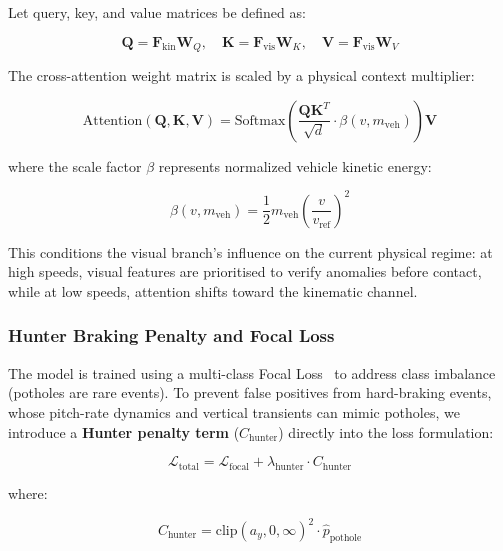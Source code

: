 \documentclass[conference]{IEEEtran}
\begin{document}
Let query, key, and value matrices be defined as:

\begin{equation}
\label{eq:qkv}
\mathbf{Q} = \mathbf{F}_{\text{kin}} \mathbf{W}_Q, \quad \mathbf{K} = \mathbf{F}_{\text{vis}} \mathbf{W}_K, \quad \mathbf{V} = \mathbf{F}_{\text{vis}} \mathbf{W}_V
\end{equation}

The cross-attention weight matrix is scaled by a physical context multiplier:

\begin{equation}
\label{eq:pica_attn}
\text{Attention}(\mathbf{Q}, \mathbf{K}, \mathbf{V}) = \text{Softmax}\left( \frac{\mathbf{Q} \mathbf{K}^T}{\sqrt{d}} \cdot \beta(v, m_{\text{veh}}) \right) \mathbf{V}
\end{equation}

where the scale factor $\beta$ represents normalized vehicle kinetic energy:

\begin{equation}
\label{eq:beta_pica}
\beta(v, m_{\text{veh}}) = \frac{1}{2} m_{\text{veh}} \left( \frac{v}{v_{\text{ref}}} \right)^2
\end{equation}

This conditions the visual branch's influence on the current physical regime: at high speeds, visual features are prioritised to verify anomalies before contact, while at low speeds, attention shifts toward the kinematic channel.

\subsubsection{Hunter Braking Penalty and Focal Loss}
The model is trained using a multi-class Focal Loss~\cite{lin2017focal} to address class imbalance (potholes are rare events).
To prevent false positives from hard-braking events, whose pitch-rate dynamics and vertical transients can mimic potholes, we introduce a \textbf{Hunter penalty term} ($C_{\text{hunter}}$) directly into the loss formulation:

\begin{equation}
\label{eq:hunter_penalty}
\mathcal{L}_{\text{total}} = \mathcal{L}_{\text{focal}} + \lambda_{\text{hunter}} \cdot C_{\text{hunter}}
\end{equation}

where:

\begin{equation}
\label{eq:hunter_c}
C_{\text{hunter}} = \text{clip}(a_y, 0, \infty)^2 \cdot \hat{p}_{\text{pothole}}
\end{equation}
\end{document}
